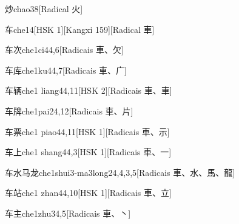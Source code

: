 \begin{entry}{炒}{chao3}{8}[Radical ⽕]
\end{entry}

\begin{entry}{车}{che1}{4}[HSK 1][Kangxi 159][Radical ⾞]
\end{entry}

\begin{entry}{车次}{che1ci4}{4,6}[Radicais ⾞、⽋]
\end{entry}

\begin{entry}{车库}{che1ku4}{4,7}[Radicais ⾞、⼴]
\end{entry}

\begin{entry}{车辆}{che1 liang4}{4,11}[HSK 2][Radicais ⾞、⾞]
\end{entry}

\begin{entry}{车牌}{che1pai2}{4,12}[Radicais ⾞、⽚]
\end{entry}

\begin{entry}{车票}{che1 piao4}{4,11}[HSK 1][Radicais ⾞、⽰]
\end{entry}

\begin{entry}{车上}{che1 shang4}{4,3}[HSK 1][Radicais ⾞、⼀]
\end{entry}

\begin{entry}{车水马龙}{che1shui3-ma3long2}{4,4,3,5}[Radicais ⾞、⽔、⾺、⿓]
\end{entry}

\begin{entry}{车站}{che1 zhan4}{4,10}[HSK 1][Radicais ⾞、⽴]
\end{entry}

\begin{entry}{车主}{che1zhu3}{4,5}[Radicais ⾞、⼂]
\end{entry}

